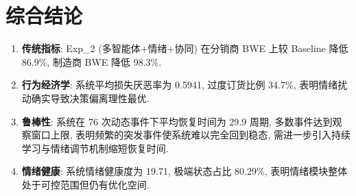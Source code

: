 \documentclass[11pt]{article}
\begin{document}
\section*{综合结论}

\begin{enumerate}
    \item \textbf{传统指标}: Exp\_2 (多智能体+情绪+协同) 在分销商 BWE 上较 Baseline 降低
          86.9\%,
          制造商 BWE 降低
          98.3\%.
    \item \textbf{行为经济学}: 系统平均损失厌恶率为
          0.5941,
          过度订货比例 34.7\%,
          表明情绪扰动确实导致决策偏离理性最优.
    \item \textbf{鲁棒性}: 系统在 76 次动态事件下平均恢复时间为
          29.9 周期,
          多数事件达到观察窗口上限, 表明频繁的突发事件使系统难以完全回到稳态,
          需进一步引入持续学习与情绪调节机制缩短恢复时间.
    \item \textbf{情绪健康}: 系统情绪健康度为
          19.71,
          极端状态占比 80.29\%,
          表明情绪模块整体处于可控范围但仍有优化空间.
\end{enumerate}
\end{document}
